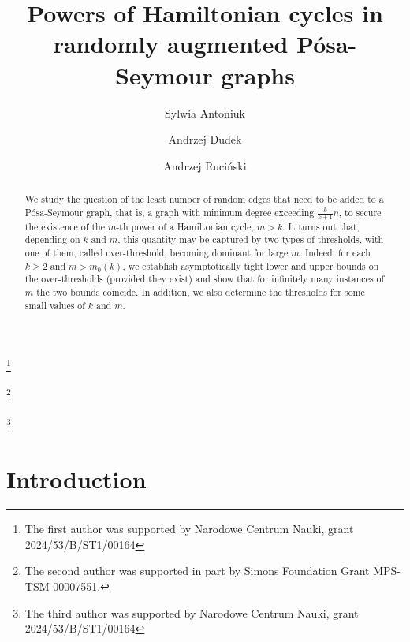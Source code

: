 \documentclass[reqno, 12pt]{amsart}
\numberwithin{equation}{section}
\numberwithin{figure}{section}
\theoremstyle{plain}
\theoremstyle{definition}
\begin{document}
	
	\title[Powers of Hamiltonian cycles in randomly augmented graphs]{Powers of Hamiltonian cycles in randomly augmented P\'osa-Seymour  graphs }
	
	\author[S. Antoniuk]{Sylwia Antoniuk}
	\address{Department of Discrete Mathematics, Adam Mickiewicz University, Pozna\'n, Poland}
	\thanks{The first author was supported by Narodowe Centrum Nauki, grant 2024/53/B/ST1/00164}
	
	
	\author[A. Dudek]{Andrzej Dudek}
	\address{Department of Mathematics, Western Michigan University, Kalamazoo, MI, USA}
	\thanks{The second author was supported in part by Simons Foundation Grant MPS-TSM-00007551.}
	
	
	\author[A. Ruci\'nski]{Andrzej Ruci\'nski}
	\address{Department of Discrete Mathematics, Adam Mickiewicz University, Pozna\'n, Poland}
	\thanks{The third author was supported by Narodowe Centrum Nauki, grant 2024/53/B/ST1/00164}
	
	
	
	\begin{abstract}
 We study the question of the least number of  random edges that need to be added to a P\'osa-Seymour  graph, that is, a graph with  minimum degree exceeding $\frac k{k+1}n$, to secure the existence of the $m$-th power of a Hamiltonian cycle, $m>k$. It turns out that, depending on $k$ and $m$, this quantity may be captured by two types of thresholds, with one of them, called over-threshold, becoming dominant for large $m$. Indeed, for each $k\ge2$ and $m>m_0(k)$, we establish asymptotically tight lower and upper bounds on the over-thresholds (provided they exist) and show that for infinitely many instances of $m$ the two bounds coincide.
  In addition, we also determine the thresholds for some small values of $k$ and $m$.
	\end{abstract}
	
	\maketitle
	
	

	
\section{Introduction}
\end{document}
